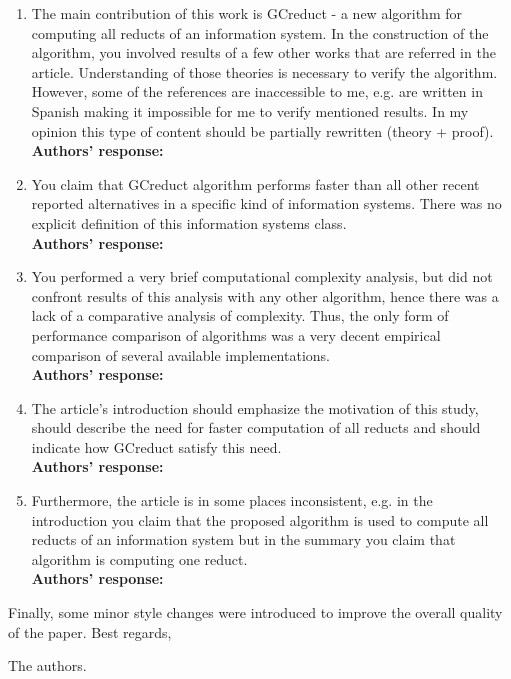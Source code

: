 \documentclass{letter}
\begin{document}
\begin{letter}{}
  \begin{enumerate}
	  \item The main contribution of this work is GCreduct - a new algorithm for computing all reducts of an information system. In the construction of the algorithm, you involved results of a few other works that are referred in the article.  Understanding of those theories is necessary to verify the algorithm. However, some of the references are inaccessible  to me, e.g. are written in Spanish making it impossible for me to verify mentioned results. In my opinion this type of content should be partially rewritten (theory + proof).\\
	  \textbf{Authors’ response:}  

	  \item You claim that GCreduct algorithm performs faster than all other recent reported alternatives in a specific kind of information systems. There was no explicit definition of this information systems class.\\
	  \textbf{Authors’ response:} 

	  \item You performed a very brief computational complexity analysis, but did not confront results of this analysis with any other algorithm, hence there was a lack of a comparative analysis of complexity. Thus, the only form of performance comparison of algorithms was a very decent empirical comparison of several available implementations.\\
	  \textbf{Authors’ response:} 

	  \item The article's introduction should emphasize the motivation of this study, should describe the need for faster computation of all reducts and should indicate how GCreduct satisfy this need.\\
	  \textbf{Authors’ response:} 
	  
	  \item Furthermore, the article is in some places inconsistent, e.g. in the introduction you  claim that the proposed algorithm is used to compute all reducts of an information system but in the summary you claim that algorithm is computing one reduct. \\
	  \textbf{Authors’ response:} 
  \end{enumerate}  
     
  
  
  
  Finally, some minor style changes were introduced to improve the overall quality of the paper.
  Best regards,
    
  \begin{flushright}
    The authors.
  \end{flushright}
\end{letter}
\end{document}
